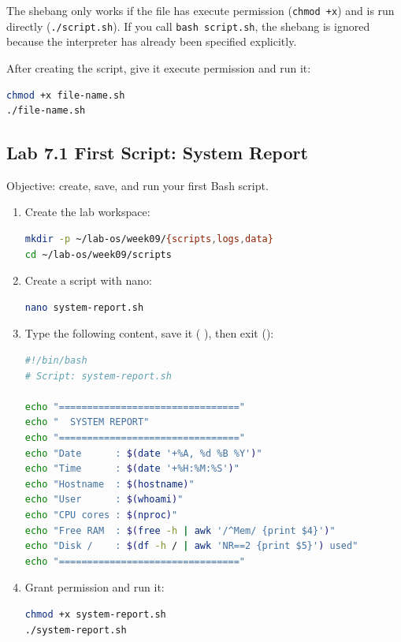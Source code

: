 \begin{notebox}
The shebang only works if the file has execute permission (\texttt{chmod +x})
and is run directly (\texttt{./script.sh}). If you call
\texttt{bash script.sh}, the shebang is ignored because the interpreter has
already been specified explicitly.
\end{notebox}

After creating the script, give it execute permission and run it:

\begin{lstlisting}[language=bash, caption={Granting permission and running a script}]
chmod +x file-name.sh
./file-name.sh
\end{lstlisting}

\subsection*{Lab 7.1 First Script: System Report}

Objective: create, save, and run your first Bash script.

\begin{enumerate}
  \item Create the lab workspace:
\begin{lstlisting}[language=bash, caption={Preparing the workspace}]
mkdir -p ~/lab-os/week09/{scripts,logs,data}
cd ~/lab-os/week09/scripts
\end{lstlisting}

  \item Create a script with nano:
\begin{lstlisting}[language=bash, caption={Opening nano}]
nano system-report.sh
\end{lstlisting}

  \item Type the following content, save it (
    ), then exit ():
\begin{lstlisting}[language=bash, caption={Contents of system-report.sh}]
#!/bin/bash
# Script: system-report.sh

echo "================================"
echo "  SYSTEM REPORT"
echo "================================"
echo "Date      : $(date '+%A, %d %B %Y')"
echo "Time      : $(date '+%H:%M:%S')"
echo "Hostname  : $(hostname)"
echo "User      : $(whoami)"
echo "CPU cores : $(nproc)"
echo "Free RAM  : $(free -h | awk '/^Mem/ {print $4}')"
echo "Disk /    : $(df -h / | awk 'NR==2 {print $5}') used"
echo "================================"
\end{lstlisting}

  \item Grant permission and run it:
\begin{lstlisting}[language=bash, caption={Running the script}]
chmod +x system-report.sh
./system-report.sh
\end{lstlisting}
\end{enumerate}

